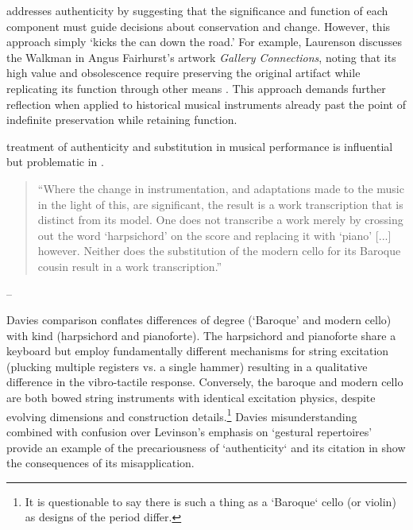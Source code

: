 \textcite{laurenson_authenticity_2006} addresses authenticity by suggesting that the significance and function of each component must guide decisions about conservation and change. However, this approach simply  `kicks the can down the road.’ For example, Laurenson discusses the Walkman in Angus Fairhurst’s artwork \textit{Gallery Connections}, noting that its high value and obsolescence require preserving the original artifact while replicating its function through other means \cite{laurenson_management_2005}. This approach demands further reflection when applied to historical musical instruments already past the point of indefinite preservation while retaining function.

\textcite{davies_authenticity_2001} treatment of authenticity and substitution in musical performance is influential but problematic in \cite{laurenson_authenticity_2006}. 

\begin{quotation}
    ``Where the change in instrumentation, and adaptations made to the music in the light of this, are significant, the result is a work transcription that is distinct from its model. One does not transcribe a work merely by crossing out the word ‘harpsichord’ on the score and replacing it with ‘piano’ [...] however. Neither does the substitution of the modern cello for its Baroque cousin result in a work transcription.''
\end{quotation}
\begin{flushright}
-- \cite[p. 222]{davies_authenticity_2001}
\end{flushright}

Davies comparison conflates differences of degree (`Baroque' and modern cello) with kind (harpsichord and pianoforte). The harpsichord and pianoforte share a keyboard but employ fundamentally different mechanisms for string excitation (plucking multiple registers vs. a single hammer) resulting in a qualitative difference in the vibro-tactile response. Conversely, the baroque and modern cello are both bowed string instruments with identical excitation physics, despite evolving dimensions and construction details.\footnote{It is questionable to say there is such a thing as a `Baroque` cello (or violin) as designs of the period differ.} Davies misunderstanding combined with confusion over Levinson's emphasis on `gestural repertoires' \cite{levinson_music_1990} provide an example of the precariousness of `authenticity` and its citation in \cite{laurenson_authenticity_2006} show the consequences of its misapplication.

